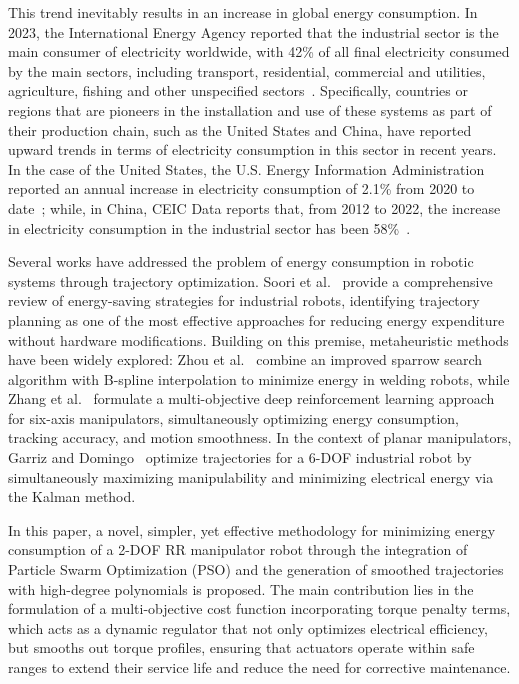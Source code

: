 \documentclass[runningheads]{llncs}
\begin{document}
This trend inevitably results in an increase in global energy consumption. In 2023, the International Energy Agency reported that the industrial sector is the main consumer of electricity worldwide, with 42\% of all final electricity consumed by the main sectors, including transport, residential, commercial and utilities, agriculture, fishing and other unspecified sectors~\cite{ref_iea}. Specifically, countries or regions that are pioneers in the installation and use of these systems as part of their production chain, such as the United States and China, have reported upward trends in terms of electricity consumption in this sector in recent years. In the case of the United States, the U.S. Energy Information Administration reported an annual increase in electricity consumption of 2.1\% from 2020 to date~\cite{ref_eia}; while, in China, CEIC Data reports that, from 2012 to 2022, the increase in electricity consumption in the industrial sector has been 58\%~\cite{ref_ceic}.

Several works have addressed the problem of energy consumption in robotic systems through trajectory optimization. Soori et al.~\cite{soori2023} provide a comprehensive review of energy-saving strategies for industrial robots, identifying trajectory planning as one of the most effective approaches for reducing energy expenditure without hardware modifications. Building on this premise, metaheuristic methods have been 
widely explored: Zhou et al.~\cite{zhou2024} combine an improved sparrow search algorithm with B-spline interpolation to minimize energy in welding robots, while Zhang et al.~\cite{zhang2023} formulate a multi-objective deep reinforcement learning approach for six-axis manipulators, 
simultaneously optimizing energy consumption, tracking accuracy, and motion smoothness. In the context of planar manipulators, Garriz and Domingo~\cite{garriz2022} optimize trajectories for a 6-DOF industrial robot by simultaneously maximizing manipulability and minimizing electrical energy via the Kalman method.

In this paper, a novel, simpler, yet effective methodology for minimizing energy consumption of a 2-DOF RR manipulator robot through the integration of Particle Swarm Optimization (PSO) and the generation of smoothed trajectories with high-degree polynomials is proposed. The main contribution lies in the formulation of a multi-objective cost function incorporating torque penalty terms, which acts as a dynamic regulator that not only optimizes electrical efficiency, but smooths out torque profiles, ensuring that actuators operate within safe ranges to extend their service life and reduce the need for corrective maintenance.
\end{document}
